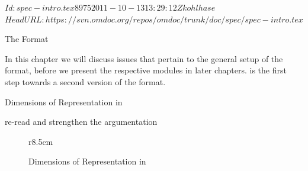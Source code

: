 \svnInfo $Id: spec-intro.tex 8975 2011-10-13 13:29:12Z kohlhase $
\svnKeyword $HeadURL: https://svn.omdoc.org/repos/omdoc/trunk/doc/spec/spec-intro.tex $

\begin{omgroup}[creators=miko,id=spec-intro]{The {\omdoc} Format}

In this chapter we will discuss issues that pertain to the general setup of the {\omdoc}
format, before we present the respective modules in later chapters. {} is the
first step towards a second version of the {\omdoc} format.


\begin{omgroup}[id=syntax-semantics]{Dimensions of Representation in {\omdoc}}
\begin{newpart}{re-read and strengthen the argumentation}
\begin{figure}r{8.5cm}\vspace*{-1em}
\caption{Dimensions of Representation in {\omdoc}}\label{fig:dimensions}\vspace*{-1em}
\end{figure}

\end{newpart}
\end{omgroup}
\end{omgroup}
